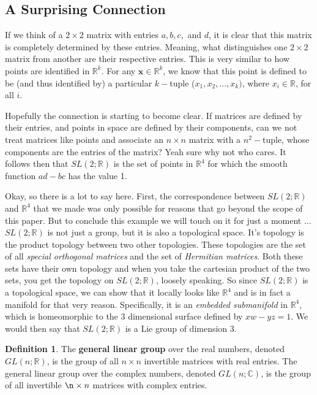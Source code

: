 \documentclass{article}
\theoremstyle{definition}
\newtheorem{definition}{Definition}[section]
\theoremstyle{remark}
\begin{document}
\subsection{A Surprising Connection}

If we think of a $2\times 2$ matrix with entries $a,b,c,$ and $d$, it is clear that this matrix is completely determined by these entries. Meaning, what distinguishes one $2\times 2$ matrix from another are their respective entries. This is very similar to how points are identified in $\mathbb{R}^k$. For any $\mathbf{x}\in\mathbb{R}^k$, we know that this point is defined to be (and thus identified by) a particular $k-$tuple ($x_1,x_2,\dots,x_k)$, where $x_i\in\mathbb{R}$, for all $i$.\par 
Hopefully the connection is starting to become clear. If matrices are defined by their entries, and points in space are defined by their components, can we not treat matrices like points and associate an $n\times n$ matrix with a $n^2-$tuple, whose components are the entries of the matrix? Yeah sure why not who cares. It follows then that $SL(2;\mathbb{R})$ is the set of points in $\mathbb{R}^4$ for which the smooth function $ad-bc$ has the value 1.\par 
Okay, so there is a lot to say here. First, the correspondence between $SL(2;\mathbb{R})$ and $\mathbb{R}^4$ that we made was only possible for reasons that go beyond the scope of this paper. But to conclude this example we will touch on it for just a moment ... $SL(2;\mathbb{R})$ is not just a group, but it is also a topological space. It's topology is the product topology between two other topologies. These topologies are the set of all \textit{special orthogonal matrices} and the set of \textit{Hermitian matrices}. Both these sets have their own topology and when you take the cartesian product of the two sets, you get the topology on $SL(2;\mathbb{R})$, loosely speaking. So since $SL(2;\mathbb{R})$ is a topological space, we can show that it locally looks like $\mathbb{R}^4$ and is in fact a manifold for that very reason. Specifically, it is an \textit{embedded submanifold} in $\mathbb{R}^4$, which is homeomorphic to the 3 dimensional surface defined by $xw-yz=1$. We would then say that $SL(2;\mathbb{R})$ is a Lie group of dimension 3.

\begin{definition}
    The \textbf{general linear group} over the real numbers, denoted $GL(n;\mathbb{R})$, is the group of all $n\times n$ invertible matrices with real entries. The general linear group over the complex numbers, denoted $GL(n;\mathbb{C})$, is the group of all invertible $\n\times n$ matrices with complex entries.
\end{definition}
\end{document}
